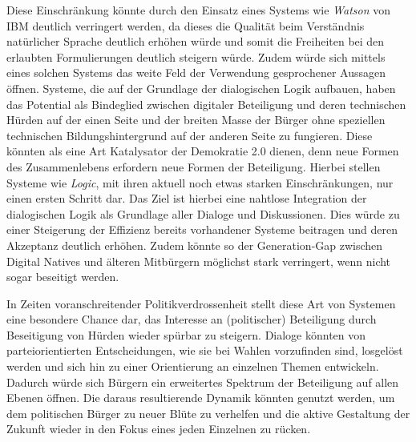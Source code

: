 \documentclass[11pt,a4paper,bibtotocnumbered]{scrreprt}
\begin{document}
Diese Einschränkung könnte durch den Einsatz eines Systems wie \textit{Watson} von IBM deutlich verringert werden, da dieses die Qualität beim Verständnis natürlicher Sprache deutlich erhöhen würde und somit die Freiheiten bei den erlaubten Formulierungen deutlich steigern würde. Zudem würde sich mittels eines solchen Systems das weite Feld der Verwendung gesprochener Aussagen öffnen.
Systeme, die auf der Grundlage der dialogischen Logik aufbauen, haben das Potential als Bindeglied zwischen digitaler Beteiligung und deren technischen Hürden auf der einen Seite und der breiten Masse der Bürger ohne speziellen technischen Bildungshintergrund auf der anderen Seite zu fungieren. Diese könnten als eine Art Katalysator der Demokratie 2.0 dienen, denn neue Formen des Zusammenlebens erfordern neue Formen der Beteiligung. Hierbei stellen Systeme wie \textit{Logic}, mit ihren aktuell noch etwas starken Einschränkungen, nur einen ersten Schritt dar. Das Ziel ist hierbei eine nahtlose Integration der dialogischen Logik als Grundlage aller Dialoge und Diskussionen.
Dies würde zu einer Steigerung der Effizienz bereits vorhandener Systeme beitragen und deren Akzeptanz deutlich erhöhen.
Zudem könnte so der Generation-Gap zwischen Digital Natives und älteren Mitbürgern möglichst stark verringert, wenn nicht sogar beseitigt werden.

In Zeiten voranschreitender Politikverdrossenheit stellt diese Art von Systemen eine besondere Chance dar, das Interesse an (politischer) Beteiligung durch Beseitigung von Hürden wieder spürbar zu steigern. Dialoge könnten von parteiorientierten Entscheidungen, wie sie bei Wahlen vorzufinden sind, losgelöst werden und sich hin zu einer Orientierung an einzelnen Themen entwickeln. Dadurch würde sich Bürgern ein erweitertes Spektrum der Beteiligung auf allen Ebenen öffnen.
Die daraus resultierende Dynamik könnten genutzt werden, um dem politischen Bürger zu neuer Blüte zu verhelfen und die aktive Gestaltung der Zukunft wieder in den Fokus eines jeden Einzelnen zu rücken.
 
\end{document}

